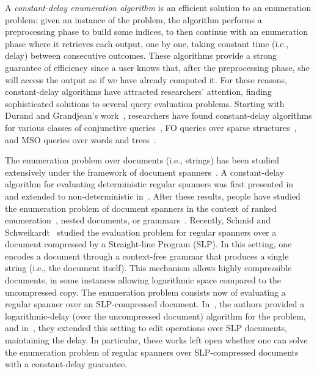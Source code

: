
A \emph{constant-delay enumeration algorithm} is an efficient solution to an enumeration problem: given an instance of the problem, the algorithm performs a preprocessing phase to build some indices, to then continue with an enumeration phase where it retrieves each output, one by one, taking constant time (i.e., delay) between consecutive outcomes.
These algorithms provide a strong guarantee of efficiency since a user knows that, after the preprocessing phase, she will access the output as if we have already computed it. 
For these reasons, constant-delay algorithms have attracted researchers' attention, finding sophisticated solutions to several query evaluation problems. Starting with Durand and Grandjean's work~\cite{DurandG07}, researchers have found constant-delay algorithms for various classes of conjunctive queries~\cite{BaganDG07,CarmeliZBKS20}, FO queries over sparse structures~\cite{KazanaS11,SchweikardtSV18}, and MSO queries over words and trees~\cite{Bagan06,AmarilliBJM17}.

The enumeration problem over documents (i.e., strings) has been studied extensively under the framework of document spanners~\cite{FaginKRV15}. A constant-delay algorithm for evaluating deterministic regular spanners was first presented in~\cite{FlorenzanoRUVV20} and extended to non-deterministic in~\cite{AmarilliBMN21}. After these results, people have studied the enumeration problem of document spanners in the context of ranked enumeration~\cite{DoleschalKMP22,BourhisGJR21}, nested documents,
or  grammars~\cite{Peterfreund21}. 
Recently, Schmid and Schweikardt~\cite{SchmidS21,SchmidS22} studied the evaluation problem for regular spanners over a document compressed by a Straight-line Program (SLP). In this setting, one encodes a document through a context-free grammar that produces a single string (i.e., the document itself). This mechanism allows highly compressible documents, in some instances allowing logarithmic space compared to the uncompressed copy.
The enumeration problem consists now of evaluating a regular spanner over an SLP-compressed document. In~\cite{SchmidS21}, the authors provided a logarithmic-delay (over the uncompressed document) algorithm for the 
problem, and in~\cite{SchmidS22}, they extended this setting to edit operations over SLP documents, maintaining the delay. In particular, these works left open whether one can solve the enumeration problem of regular spanners over SLP-compressed documents with a constant-delay guarantee. 

